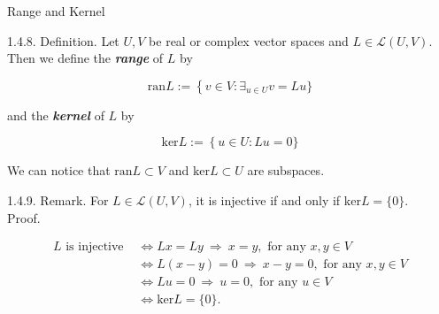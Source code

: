 \documentclass[hyperref={pdfpagelabels=true}]{beamer}
\newcommand{\highlightg}[1]{\textcolor[rgb]{0.1,0.5,0.3}{\emph{\textbf{#1}}}}
\newcommand{\structb}[1]{\textcolor[rgb]{0.2,0.2,0.7}{#1}}
\newcommand{\<}{\langle}
\renewcommand{\>}{\rangle}
\begin{document}
\begin{frame}{Range and Kernel}
    \begin{block}{1.4.8. Definition.}
        Let $U,V$ be real or complex vector spaces and $L \in \mathcal{L}(U,V)$. Then we define the \highlightg{range} of $L$ by
        \begin{spacing}{0.8} 
        \[\text{ran}L:=\left\{v \in V:\exists_{u \in U}v = Lu\}\right.\]
        \end{spacing}
        and the \highlightg{kernel} of $L$ by
        \begin{spacing}{0.8}
        \[\text{ker}L:=\left\{u \in U:Lu = 0\}\right. \]
        \end{spacing}
        We can notice that $\text{ran}L \subset V$ and $\text{ker}L \subset U$ are subspaces.
    \end{block}
    \begin{block}{1.4.9. Remark.}
        For $L \in \mathcal{L}(U,V)$, it is injective if and only if $\text{ker}L = \{0\}.$\\
    \structb{Proof.}
    \begin{spacing}{0.4}
        \[
            \begin{aligned}
                L\text{ is injective }  
                & \Leftrightarrow 
                Lx = Ly \ \Rightarrow\ x = y, \text{ for any }x,y \in V \\
                & \Leftrightarrow
                L(x-y) = 0 \ \Rightarrow\ x-y = 0, \text{ for any }x,y \in V\\
                & \Leftrightarrow
                Lu = 0 \ \Rightarrow\ u = 0, \text{ for any }u \in V\\
                & \Leftrightarrow
                \text{ker}L = \{0\}.
            \end{aligned}
        \]
    \end{spacing}
    \end{block}
\end{frame}
\end{document}
